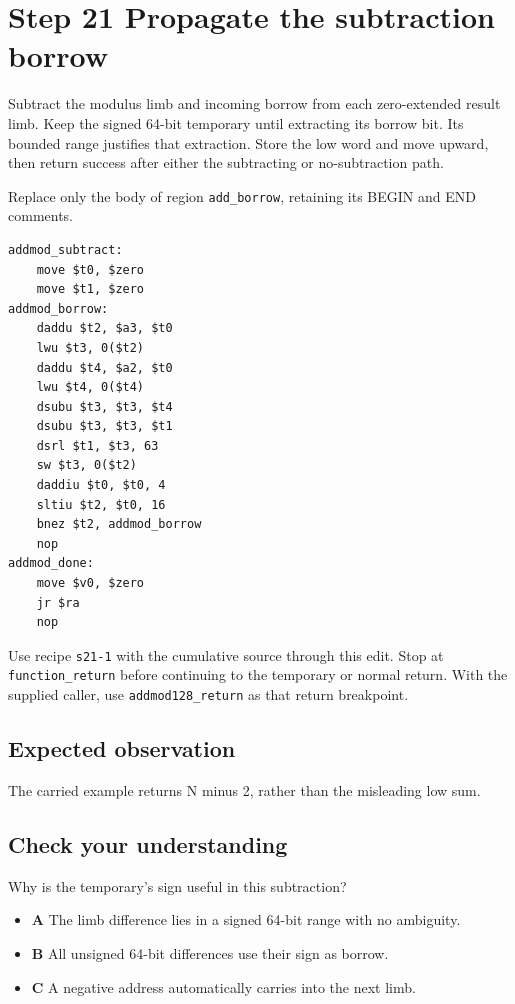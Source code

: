 \section{Step 21 Propagate the subtraction borrow}\label{rsa-s21}

Subtract the modulus limb and incoming borrow from each zero-extended result limb. Keep the signed 64-bit temporary until extracting its borrow bit. Its bounded range justifies that extraction. Store the low word and move upward, then return success after either the subtracting or no-subtraction path.

Replace only the body of region \texttt{add\_borrow}, retaining its BEGIN and END comments.

\begin{verbatim}
addmod_subtract:
    move $t0, $zero
    move $t1, $zero
addmod_borrow:
    daddu $t2, $a3, $t0
    lwu $t3, 0($t2)
    daddu $t4, $a2, $t0
    lwu $t4, 0($t4)
    dsubu $t3, $t3, $t4
    dsubu $t3, $t3, $t1
    dsrl $t1, $t3, 63
    sw $t3, 0($t2)
    daddiu $t0, $t0, 4
    sltiu $t2, $t0, 16
    bnez $t2, addmod_borrow
    nop
addmod_done:
    move $v0, $zero
    jr $ra
    nop
\end{verbatim}

Use recipe \texttt{s21-1} with the cumulative source through this edit. Stop at \texttt{function\_return} before continuing to the temporary or normal return. With the supplied caller, use \texttt{addmod128\_return} as that return breakpoint.

\subsection{Expected observation}
The carried example returns N minus 2, rather than the misleading low sum.

\subsection{Check your understanding}
Why is the temporary's sign useful in this subtraction?

\begin{itemize}
\item \textbf{A} The limb difference lies in a signed 64-bit range with no ambiguity.
\item \textbf{B} All unsigned 64-bit differences use their sign as borrow.
\item \textbf{C} A negative address automatically carries into the next limb.
\end{itemize}
